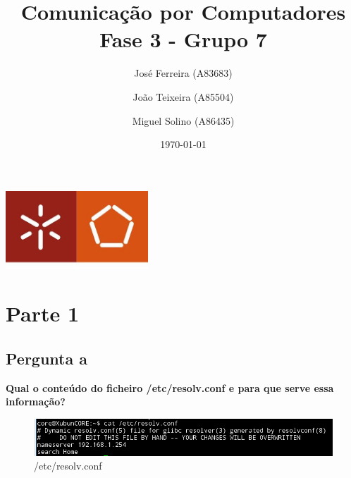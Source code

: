 \documentclass[a4paper]{report}
\begin{document}
\title{Comunicação por Computadores\\ 
\large Fase 3 - Grupo 7}
\author{José Ferreira (A83683) \and João Teixeira (A85504) \and Miguel Solino (A86435)}
\date{\today}

\begin{center}
    \begin{minipage}{0.75\linewidth}
        \centering
        \includegraphics[width=0.4\textwidth]{images/eng.jpeg}\par\vspace{1cm}
        \vspace{1.5cm}
        \href{https://www.uminho.pt/PT}
        {\color{black}{\scshape\LARGE Universidade do Minho}} \par
        \vspace{1cm}
        \href{https://www.di.uminho.pt/}
        {\color{black}{\scshape\Large Departamento de Informática}} \par
        \vspace{1.5cm}
        \maketitle
    \end{minipage}
\end{center}

\chapter{Parte 1}
\section{Pergunta a}
\textbf{Qual o conteúdo do ficheiro /etc/resolv.conf e para que serve essa
informação?}
\begin{figure}[H]
    \centering 
    \includegraphics[width=\textwidth]{images/resolv.png}  
    \caption{/etc/resolv.conf}
    \label{fig:resolv}
\end{figure}
\end{document}
